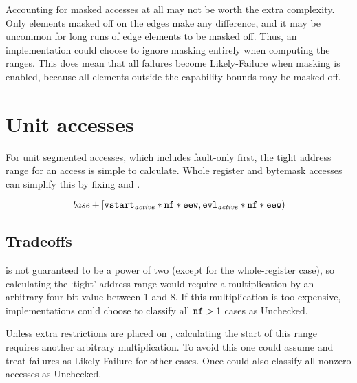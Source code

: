 Accounting for masked accesses at all may not be worth the extra complexity.
Only elements masked off on the edges make any difference, and it may be uncommon for long runs of edge elements to be masked off.
Thus, an implementation could choose to ignore masking entirely when computing the ranges.
This does mean that all failures become Likely-Failure when masking is enabled, because all elements outside the capability bounds may be masked off.


\section{Unit accesses}
For unit segmented accesses, which includes fault-only first, the tight address range for an access is simple to calculate.
Whole register and bytemask accesses can simplify this by fixing  and .

\begin{equation}
    \mathit{base}{} + [{\texttt{vstart}}_{\mathit{active}}{} * {\texttt{nf}} * {\texttt{eew}}, {\texttt{evl}}_{\mathit{active}}{} * {\texttt{nf}} * {\texttt{eew}})
\end{equation}

\subsection*{Tradeoffs}
 is not guaranteed to be a power of two (except for the whole-register case), so calculating the `tight' address range would require a multiplication by an arbitrary four-bit value between 1 and 8.
If this multiplication is too expensive, implementations could choose to classify all ${\texttt{nf}} > 1$ cases as Unchecked.

Unless extra restrictions are placed on , calculating the start of this range requires another arbitrary multiplication.
To avoid this one could assume  and treat failures as Likely-Failure for other cases.
Once could also classify all nonzero  accesses as Unchecked.

